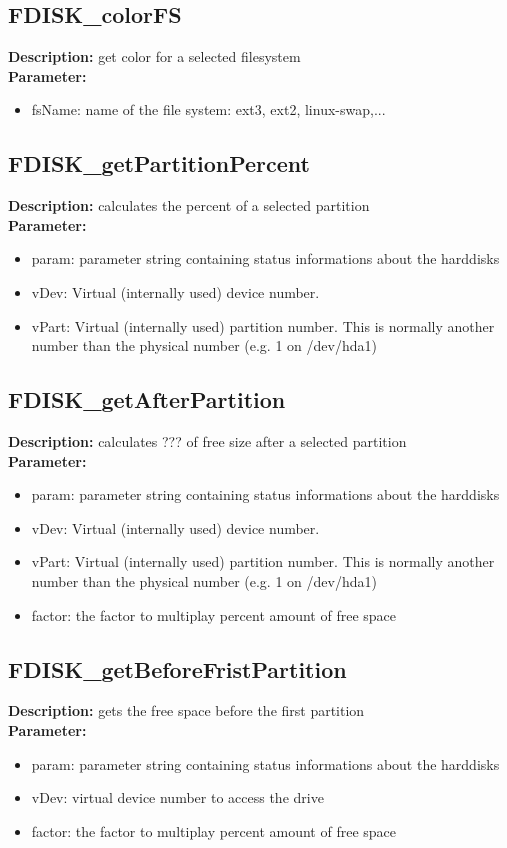 \subsection{FDISK\_colorFS}
\textbf{Description:} get color for a selected filesystem\\
\textbf{Parameter:}
\begin{itemize}
\item fsName: name of the file system: ext3, ext2, linux-swap,...
\end{itemize}

\subsection{FDISK\_getPartitionPercent}
\textbf{Description:} calculates the percent of a selected partition\\
\textbf{Parameter:}
\begin{itemize}
\item param: parameter string containing status informations about the harddisks
\item vDev: Virtual (internally used) device number.
\item vPart: Virtual (internally used) partition number. This is normally another number than the physical number (e.g. 1 on /dev/hda1)
\end{itemize}

\subsection{FDISK\_getAfterPartition}
\textbf{Description:} calculates ??? of free size after a selected partition\\
\textbf{Parameter:}
\begin{itemize}
\item param: parameter string containing status informations about the harddisks
\item vDev: Virtual (internally used) device number.
\item vPart: Virtual (internally used) partition number. This is normally another number than the physical number (e.g. 1 on /dev/hda1)
\item factor: the factor to multiplay percent amount of free space
\end{itemize}

\subsection{FDISK\_getBeforeFristPartition}
\textbf{Description:} gets the free space before the first partition\\
\textbf{Parameter:}
\begin{itemize}
\item param: parameter string containing status informations about the harddisks
\item vDev: virtual device number to access the drive
\item factor: the factor to multiplay percent amount of free space
\end{itemize}

